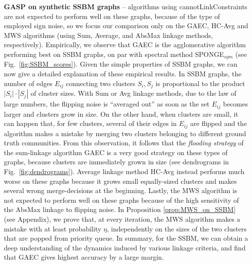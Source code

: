 \textbf{GASP on synthetic SSBM graphs}  -- 
\algname{} algorithms using cannotLinkConstraints are not expected to perform well on these graphs, because of the type of employed sign noise, so we focus our comparison only on the GAEC, HC-Avg and MWS algorithms (using Sum, Average, and AbsMax linkage methods, respectively).
Empirically, we observe that GAEC is the agglomerative algorithm performing best on SSBM graphs, on par with spectral method SPONGE$_{sym}$ (see Fig.~\ref{fig:SSBM_scores}). Given the simple properties of SSBM graphs, we can now give a detailed explanation of these empirical results. 
In SSBM graphs, the number of edges $E_{ij}$
connecting two clusters $S_i,S_j$ is  proportional to the product $|S_i|\cdot|S_j|$ of cluster sizes. 
With Sum or Avg linkage methods, due to the law of large numbers, the flipping noise is ``averaged out'' as soon as the set $E_{ij}$ becomes larger and clusters grow in size.
On the other hand, when clusters are small, it can happen that, for few clusters, several of their edges in $E_{ij}$ are flipped and the algorithm makes a mistake by merging two clusters belonging to different ground truth communities. From this observation, it follows that the \emph{flooding strategy} of the sum-linkage algorithm GAEC is a very good strategy on these types of graphs, because clusters are immediately grown in size (see dendrograms in Fig.~\ref{fig:dendrograms}). Average linkage method HC-Avg instead performs much worse on these graphs because it grows small equally-sized clusters and makes several wrong merge-decisions at the beginning. 
Lastly, the MWS algorithm is not expected to perform well on these graphs because of the high sensitivity of the AbsMax linkage to flipping noise. In Proposition \ref{prop:MWS_on_SSBM} (see Appendix), we prove that, at every iteration, the MWS algorithm makes a mistake with at least probability $\eta$, independently on the sizes of the two clusters that are popped from priority queue.
In summary, for the SSBM, we can obtain a deep understanding of the dynamics induced by various linkage criteria, and find that GAEC gives highest accuracy by a large margin.





